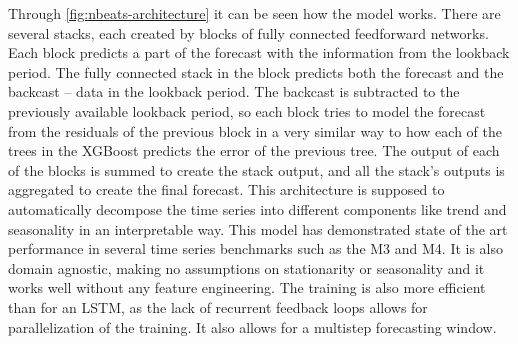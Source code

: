 \begin{itemize}
    Through \autoref{fig:nbeats-architecture} it can be seen how the model works. There are several stacks, each created by blocks of fully connected feedforward networks. Each block predicts a part of the forecast with the information from the lookback period. The fully connected stack in the block predicts both the forecast and the backcast -- data in the lookback period. The backcast is subtracted to the previously available lookback period, so each block tries to model the forecast from the residuals of the previous block in a very similar way to how each of the trees in the XGBoost predicts the error of the previous tree. The output of each of the blocks is summed to create the stack output, and all the stack's outputs is aggregated to create the final forecast. This architecture is supposed to automatically decompose the time series into different components like trend and seasonality in an interpretable way. This model has demonstrated state of the art performance in several time series benchmarks such as the M3 and M4. It is also domain agnostic, making no assumptions on stationarity or seasonality and it works well without any feature engineering. The training is also more efficient than for an LSTM, as the lack of recurrent feedback loops allows for parallelization of the training. It also allows for a multistep forecasting window. 
    

\end{itemize}
